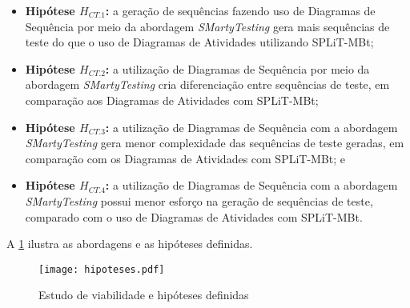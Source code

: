 \begin{itemize}
	\item \textbf{Hipótese $H_{CT.1}$:} a geração de sequências fazendo uso de Diagramas de Sequência por meio da abordagem \textit{SMartyTesting} gera mais sequências de teste do que o uso de Diagramas de Atividades utilizando SPLiT-MBt;
	
	\item \textbf{Hipótese $H_{CT.2}$:} a utilização de Diagramas de Sequência por meio da abordagem \textit{SMartyTesting} cria diferenciação entre sequências de teste, em comparação aos Diagramas de Atividades com SPLiT-MBt;
	
	\item \textbf{Hipótese $H_{CT.3}$:} a utilização de Diagramas de Sequência com a abordagem \textit{SMartyTesting} gera menor complexidade das sequências de teste geradas, em comparação com os Diagramas de Atividades com SPLiT-MBt; e

	\item \textbf{Hipótese $H_{CT.4}$:} a utilização de Diagramas de Sequência com a abordagem \textit{SMartyTesting} possui menor esforço na geração de sequências de teste, comparado com o uso de Diagramas de Atividades com SPLiT-MBt.
\end{itemize}

A \ref{fig:hipoteses} ilustra as abordagens e as hipóteses definidas.

\begin{figure}[H]
	\centering
	\texttt{[image: hipoteses.pdf]}
	\caption{Estudo de viabilidade e hipóteses definidas}
	\label{fig:hipoteses}
\end{figure}

\
